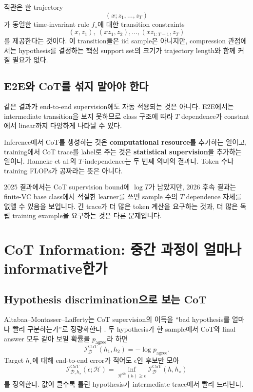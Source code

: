 \documentclass[11pt,a4paper,oneside,openany]{memoir}
\newcommand{\Hc}{\mathcal{H}}
\newcommand{\D}{\mathcal{D}}
\newcommand{\Risk}{\mathcal{R}}
\newcommand{\Icot}{\mathcal{I}^{\mathrm{CoT}}}
\theoremstyle{definition}
\begin{document}
직관은 한 trajectory
\[
(x;z_1,\ldots,z_T)
\]
가 동일한 time-invariant rule $f_\star$에 대한 transition constraints
\[
(x,z_1),\ (xz_1,z_2),\ldots,(xz_{1:T-1},z_T)
\]
를 제공한다는 것이다. 이 transition들은 iid sample은 아니지만, compression 관점에서는 hypothesis를 결정하는 핵심 support set의 크기가 trajectory length와 함께 커질 필요가 없다.

\section{E2E와 CoT를 섞지 말아야 한다}

같은 결과가 end-to-end supervision에도 자동 적용되는 것은 아니다. E2E에서는 intermediate transition을 보지 못하므로 class 구조에 따라 $T$ dependence가 constant에서 linear까지 다양하게 나타날 수 있다.

\begin{keybox}
Inference에서 CoT를 생성하는 것은 \textbf{computational resource}를 추가하는 일이고, training에서 CoT trace를 label로 주는 것은 \textbf{statistical supervision}을 추가하는 일이다. Hanneke et al.의 $T$-independence는 두 번째 의미의 결과다. Token 수나 training FLOPs가 공짜라는 뜻은 아니다.
\end{keybox}

\begin{presentbox}
2025 결과에서는 CoT supervision bound에 $\log T$가 남았지만, 2026 후속 결과는 finite-VC base class에서 적절한 learner를 쓰면 sample 수의 $T$ dependence 자체를 없앨 수 있음을 보입니다. 긴 trace가 더 많은 token 계산을 요구하는 것과, 더 많은 독립 training example을 요구하는 것은 다른 문제입니다.
\end{presentbox}

\chapter{CoT Information: 중간 과정이 얼마나 informative한가}

\section{Hypothesis discrimination으로 보는 CoT}

Altabaa--Montasser--Lafferty는 CoT supervision의 이득을 ``bad hypothesis를 얼마나 빨리 구분하는가''로 정량화한다 \cite{altabaa2025}. 두 hypothesis가 한 sample에서 CoT와 final answer 모두 같아 보일 확률을 $p_{\mathrm{agree}}$라 하면
\[
\Icot_{\D}(h_1,h_2)
=-\log p_{\mathrm{agree}}.
\]
Target $h_\star$에 대해 end-to-end error가 적어도 $\epsilon$인 후보만 모아
\[
\Icot_{\D,h_\star}(\epsilon;\Hc)
=
\inf_{\Risk^{\mathrm{e2e}}(h)\ge\epsilon}
\Icot_\D(h,h_\star)
\]
를 정의한다. 값이 클수록 틀린 hypothesis가 intermediate trace에서 빨리 드러난다.
\end{document}
